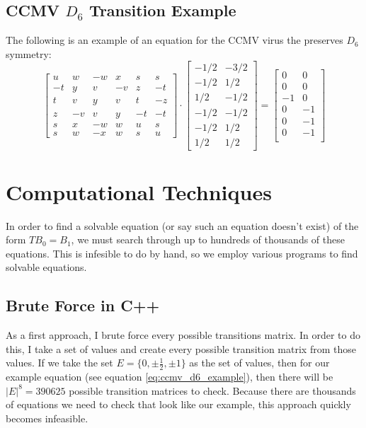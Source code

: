 \documentclass[a4paper,10pt]{article}
\theoremstyle{plain}
\theoremstyle{definition}
\theoremstyle{remark}
\newcommand\abs[1]{\left|#1\right|}
\begin{document}
\subsection{CCMV \(D_6\) Transition Example}
The following is an example of an equation for the CCMV virus the preserves \(D_6\) symmetry:
\begin{equation}
	\begin{bmatrix}
	    u  & w  & -w & x  & s  & s  \\
	    -t & y  & v  & -v & z  & -t \\
	    t  & v  & y  & v  & t  & -z \\
	    z  & -v & v  & y  & -t & -t \\
	    s  & x  & -w & w  & u  & s  \\
	    s  & w  & -x & w  & s  & u 
	\end{bmatrix}
	\cdot
	\begin{bmatrix}
	-1/2 & -3/2 \\
	-1/2 & 1/2 \\
	1/2 & -1/2 \\
	-1/2 & -1/2 \\
	-1/2 & 1/2 \\
	1/2 & 1/2
	\end{bmatrix} 
	=
	\begin{bmatrix}
	0 & 0 \\
	0 & 0 \\
	-1 & 0 \\
	0 & -1 \\
	0 & -1 \\
	0 & -1 \\
	\end{bmatrix}
	\label{eq:ccmv_d6_example}
\end{equation}

\section{Computational Techniques}
In order to find a solvable equation (or say such an equation doesn't exist) of the form \(TB_0 = B_1\), we must search through up to hundreds of thousands of these equations.
This is infesible to do by hand, so we employ various programs to find solvable equations.

\subsection{Brute Force in C++}
As a first approach, I brute force every possible transitions matrix.
In order to do this, I take a set of values and create every possible transition matrix from those values.
If we take the set \(E = \{0, \pm\frac{1}{2}, \pm 1\}\) as the set of values, then for our example equation (see equation \ref{eq:ccmv_d6_example}), then there will be \(\abs{E}^8 = 390625\) possible transition matrices to check.
Because there are thousands of equations we need to check that look like our example, this approach quickly becomes infeasible.
\end{document}
